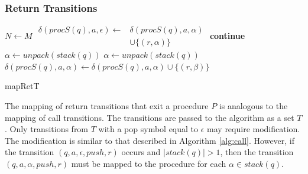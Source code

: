         \subsubsection*{Return Transitions}
            \begin{algorithm}
                \footnotesize
                \DontPrintSemicolon
                \setcounter{AlgoLine}{0}

                $N \leftarrow M$\;
                {
                    {
                            {
                                $\begin{aligned}\delta(procS(q), a, \epsilon) \leftarrow &\delta(procS(q), a, \alpha)\\
                                     &\cup \{(r, \alpha)\}
                                \end{aligned}$
                            }
                        \textbf{continue}\;
                    }
                    {
                        $\alpha \leftarrow unpack(stack(q))$\;
                    }\ElseIf{$\alpha = \epsilon \land \beta \neq \epsilon$}
                    {
                        $\alpha \leftarrow unpack(stack(q))$
                    }
                    $\delta(procS(q), a, \alpha) \leftarrow \delta(procS(q), a, \alpha) \cup \{(r, \beta)\}$\;
                }


                \normalsize
                \caption{mapRetT}
            \end{algorithm}

            The mapping of return transitions that exit a procedure $P$ is analogous to the mapping of call transitions. The transitions are passed to the algorithm as a set $T$. Only transitions from $T$ with a pop symbol equal to $\epsilon$ may require modification. The modification is similar to that described in Algorithm \ref{alg:call}. However, if the transition $(q, a, \epsilon, push, r)$ occurs and $|stack(q)| > 1$, then the transition $(q, a, \alpha, push, r)$ must be mapped to the procedure for each $\alpha \in stack(q)$.

